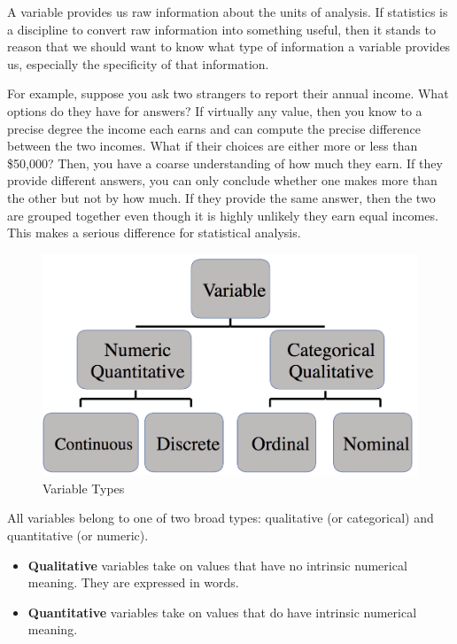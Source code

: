 \documentclass[
]{book}
\providecommand{\tightlist}{%
  \setlength{\itemsep}{0pt}\setlength{\parskip}{0pt}}
\begin{document}
A variable provides us raw information about the units of analysis. If statistics is a discipline to convert raw information into something useful, then it stands to reason that we should want to know what type of information a variable provides us, especially the specificity of that information.

For example, suppose you ask two strangers to report their annual income. What options do they have for answers? If virtually any value, then you know to a precise degree the income each earns and can compute the precise difference between the two incomes. What if their choices are either more or less than \$50,000? Then, you have a coarse understanding of how much they earn. If they provide different answers, you can only conclude whether one makes more than the other but not by how much. If they provide the same answer, then the two are grouped together even though it is highly unlikely they earn equal incomes. This makes a serious difference for statistical analysis.

\begin{figure}
\includegraphics[width=13.99in]{images/variables} \caption{Variable Types}\label{fig:vartypefig}
\end{figure}

All variables belong to one of two broad types: qualitative (or categorical) and quantitative (or numeric).

\begin{itemize}
\tightlist
\item
  \textbf{Qualitative} variables take on values that have no intrinsic numerical meaning. They are expressed in words.
\item
  \textbf{Quantitative} variables take on values that do have intrinsic numerical meaning.
\end{itemize}
\end{document}
